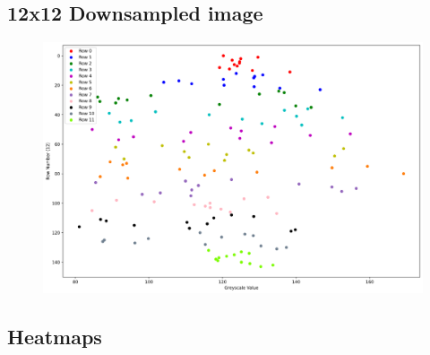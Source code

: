 \documentclass[11pt]{article}
\begin{document}
\begin{appendices}
\newpage
\subsection{12x12 Downsampled image}\label{12x12Scatter}
\begin{figure}[h!]
  \centering
  \includegraphics[scale=0.4]{Images/12x12 Scatter.png}
\end{figure}

\newpage
\subsection{Heatmaps}\label{Heatmaps}
\begin{figure}[h!]
  \centering
  \hfill
\end{figure}


\end{appendices}
\end{document}
